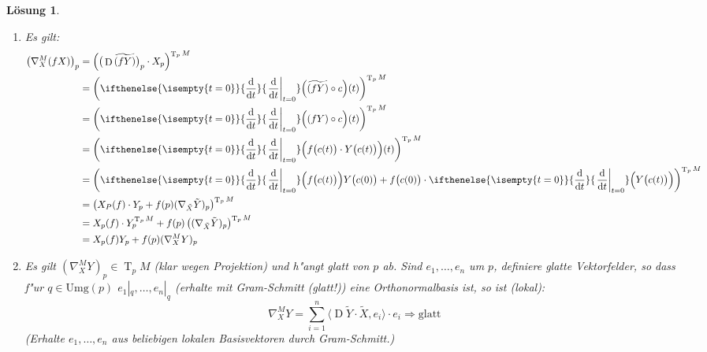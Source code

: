 \documentclass[paper=A4, twoside, chapterprefix=true, bibliography=totoc, headsepline]{scrbook}
\DeclareMathOperator{\D}{D}         %
\DeclareMathOperator{\T}{T}         %
\newcommand{\dop}{\mathrm{d}}
\newcommand{\difffrac}[3][]{\ifthenelse{\isempty{#1}}{\frac{\dop #2}{\dop #3}}{\left. \frac{\dop #2}{\dop #3} \right|_{#1}}}
\theoremstyle{plain}
\theoremstyle{nonumberplain}
\theoremstyle{empty}
\theoremstyle{break}
\newtheorem{Loes}{L\"osung}
\begin{document}
\begin{Loes}
\begin{enumerate}[label=(\arabic*.\arabic*)]
\begin{align*}
		&= \left( (\D \tilde Y)_p (f(p)X_p) \right)^{\T_pM}\\
		&= f(p) \left( (\D \tilde Y)_p X_p \right)^{\T_pM}\\
		&= f(p) \left( \nabla_X^M Y)_p \right)
	\end{align*}
\item[(2.2)]
	Es gilt:
	\begin{align*}
		\left( \nabla_X^M(fX) \right)_p &= \left( \big(\D\widetilde{(fY)}\big)_p \cdot X_p \right)^{\T_pM}\\
		&= \left( \difffrac[t=0]{}{t} \Big( \widetilde{(fY)} \circ c \Big) (t) \right)^{\T_pM}\\
		&= \left( \difffrac[t=0]{}{t} \Big( (fY) \circ c \Big) (t) \right)^{\T_pM}\\
		&= \left( \difffrac[t=0]{}{t} \Big( f\big(c(t)\big) \cdot Y\big(c(t)\big) \Big) (t) \right)^{\T_pM}\\
		&= \left( \difffrac[t=0]{}{t} \Big( f\big(c(t)\big) \Big) Y\big(c(0)\big) + f\big(c(0)\big) \cdot \difffrac[t=0]{}{t} \Big( Y\big(c(t)\big) \Big) \right)^{\T_pM}\\
		&= \left( X_P(f) \cdot Y_p + f(p)(\nabla_{\tilde X} \tilde Y)_p \right)^{\T_pM}\\
		&= X_p(f) \cdot Y_p^{\T_pM} + f(p)\left((\nabla_{\tilde X} \tilde Y)_p \right)^{\T_pM}\\
		&= X_p(f) Y_p + f(p)(\nabla_X^MY)_p
	\end{align*}
\item[(3)]
	Es gilt $(\nabla_X^MY)_p \in \T_pM$ (klar wegen Projektion) und h"angt glatt von $p$ ab. Sind $e_1, \ldots ,e_n$ um $p$, definiere glatte Vektorfelder, so dass f"ur $q \in \mathrm{Umg}(p)$ $e_1|_q, \ldots ,e_n|_q$ (erhalte mit Gram-Schmitt (glatt!)) eine Orthonormalbasis ist, so ist (lokal):
		\[ \nabla_X^M Y = \sum_{i=1}^n \langle \D \tilde Y \cdot \tilde X, e_i \rangle \cdot e_i \Rightarrow \text{glatt} \]
	(Erhalte $e_1,\ldots ,e_n$ aus beliebigen lokalen Basisvektoren durch Gram-Schmitt.)
\end{enumerate}
\end{Loes}
\end{document}
